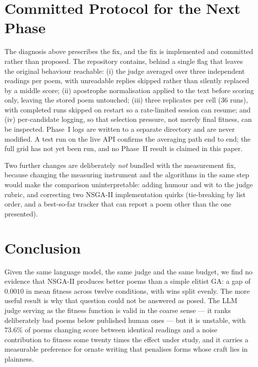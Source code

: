 \documentclass[conference]{IEEEtran}
\begin{document}
\section{Committed Protocol for the Next Phase}\label{sec:phase2}
The diagnosis above prescribes the fix, and the fix is implemented and committed
rather than proposed. The repository contains, behind a single flag that leaves
the original behaviour reachable: (i) the judge averaged over three independent
readings per poem, with unreadable replies skipped rather than silently replaced
by a middle score; (ii) apostrophe normalisation applied to the text before
scoring only, leaving the stored poem untouched; (iii) three replicates per cell
(36 runs), with completed runs skipped on restart so a rate-limited session can
resume; and (iv) per-candidate logging, so that selection pressure, not merely
final fitness, can be inspected. Phase~I logs are written to a separate directory
and are never modified. A test run on the live API confirms the averaging path
end to end; the full grid has not yet been run, and no Phase~II result is claimed
in this paper.

Two further changes are deliberately \emph{not} bundled with the measurement fix,
because changing the measuring instrument and the algorithms in the same step
would make the comparison uninterpretable: adding humour and wit to the judge
rubric, and correcting two NSGA-II implementation quirks (tie-breaking by list
order, and a best-so-far tracker that can report a poem other than the one
presented).

\section{Conclusion}
Given the same language model, the same judge and the same budget, we find no
evidence that NSGA-II produces better poems than a simple elitist GA: a gap of
$0.0010$ in mean fitness across twelve conditions, with wins split evenly. The
more useful result is why that question could not be answered as posed. The LLM
judge serving as the fitness function is valid in the coarse sense --- it ranks
deliberately bad poems below published human ones --- but it is unstable, with
$73.6\%$ of poems changing score between identical readings and a noise
contribution to fitness some twenty times the effect under study, and it carries
a measurable preference for ornate writing that penalises forms whose craft lies
in plainness.
\end{document}
